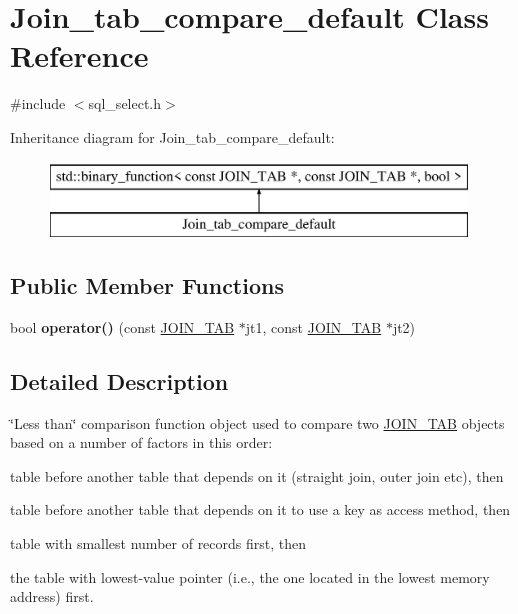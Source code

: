 \hypertarget{classJoin__tab__compare__default}{}\section{Join\+\_\+tab\+\_\+compare\+\_\+default Class Reference}
\label{classJoin__tab__compare__default}


{\ttfamily \#include $<$sql\+\_\+select.\+h$>$}

Inheritance diagram for Join\+\_\+tab\+\_\+compare\+\_\+default\+:\begin{figure}[H]
\begin{center}
\leavevmode
\includegraphics[height=2.000000cm]{classJoin__tab__compare__default}
\end{center}
\end{figure}
\subsection*{Public Member Functions}
\begin{DoxyCompactItemize}
\item 
\mbox{\label{classJoin__tab__compare__default_a349c9036cb7053ea9331262d8c630b83}} 
bool {\bfseries operator()} (const \mbox{\hyperlink{classJOIN__TAB}{J\+O\+I\+N\+\_\+\+T\+AB}} $\ast$jt1, const \mbox{\hyperlink{classJOIN__TAB}{J\+O\+I\+N\+\_\+\+T\+AB}} $\ast$jt2)
\end{DoxyCompactItemize}


\subsection{Detailed Description}
\char`\"{}\+Less than\char`\"{} comparison function object used to compare two \mbox{\hyperlink{classJOIN__TAB}{J\+O\+I\+N\+\_\+\+T\+AB}} objects based on a number of factors in this order\+:


\begin{DoxyItemize}
\item table before another table that depends on it (straight join, outer join etc), then
\item table before another table that depends on it to use a key as access method, then
\item table with smallest number of records first, then
\item the table with lowest-\/value pointer (i.\+e., the one located in the lowest memory address) first.
\end{DoxyItemize}


